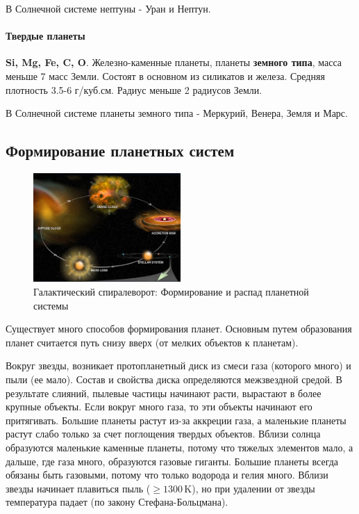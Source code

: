 В Солнечной системе нептуны - Уран и Нептун. 

\paragraph{Твердые планеты} \textbf{Si, Mg, Fe, C, O}. Железно-каменные планеты, планеты \textbf{земного типа}, масса меньше 7 масс Земли. Состоят в основном из силикатов и железа. Средняя плотность 3.5-6 г/куб.см. Радиус меньше 2 радиусов Земли.

В Солнечной системе планеты земного типа - Меркурий, Венера, Земля и Марс. 

\subsection{Формирование планетных систем}

\begin{figure}
  \begin{center}
    \includegraphics[width=0.5\textwidth]{Pictures/4_spiral.png}
  \end{center}
  \caption{Галактический спиралеворот: Формирование и распад планетной системы}
  \label{fig:4_spiral}
\end{figure}Существует много способов формирования планет. Основным путем образования планет считается путь снизу вверх (от мелких объектов к планетам).

Вокруг звезды, возникает протопланетный диск из смеси газа (которого много) и пыли (ее мало). Состав и свойства диска определяются межзвездной средой. В результате слияний, пылевые частицы начинают расти, вырастают в более крупные объекты. Если вокруг много газа, то эти объекты начинают его притягивать. Большие планеты растут из-за аккреции газа, а маленькие планеты растут слабо только за счет поглощения твердых объектов. Вблизи солнца образуются маленькие каменные планеты, потому что тяжелых элементов мало, а дальше, где газа много, образуются газовые гиганты. Большие планеты всегда обязаны быть газовыми, потому что только водорода и гелия много. Вблизи звезды начинает плавиться пыль ($\ge 1300\,\text{K}$), но при удалении от звезды температура падает (по закону Стефана-Больцмана). 

